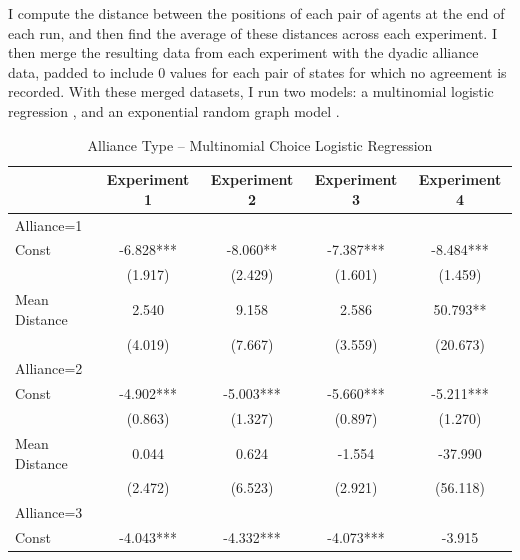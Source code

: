 I compute the distance between the positions of each pair of agents at the end of each run, and then find the average of these distances across each experiment. I then merge the resulting data from each experiment with the dyadic alliance data, padded to include 0 values for each pair of states for which no agreement is recorded. With these merged datasets, I run two models: a multinomial logistic regression \citep{mcfadden_1984}, and an exponential random graph model \citep{robins_2007}. 



\begin{table}
  \begin{center}   
    \caption{Alliance Type -- Multinomial Choice Logistic Regression}
    \label{table:mc_logit_results}
  \begin{tabular}{lcccc}
  \hline
                & Experiment 1 & Experiment 2 & Experiment 3 & Experiment 4 \\
  \hline
  \multicolumn{5}{l}{Alliance=1}                                            \\
  \hline
  Const         & -6.828***    & -8.060**     & -7.387***    & -8.484***    \\
                & (1.917)      & (2.429)      & (1.601)      & (1.459)      \\
  Mean Distance & 2.540        & 9.158        & 2.586        & 50.793**     \\
                & (4.019)      & (7.667)      & (3.559)      & (20.673)     \\
  \hline
  \multicolumn{5}{l}{Alliance=2}                                            \\
  \hline
  Const         & -4.902***    & -5.003***    & -5.660***    & -5.211***    \\
                & (0.863)      & (1.327)      & (0.897)      & (1.270)      \\
  Mean Distance & 0.044        & 0.624        & -1.554       & -37.990      \\
                & (2.472)      & (6.523)      & (2.921)      & (56.118)     \\
  \hline
  \multicolumn{5}{l}{Alliance=3}                                            \\
  \hline
  Const         & -4.043***    & -4.332***    & -4.073***    & -3.915       \\

\end{tabular}
\end{center}
\end{table}
